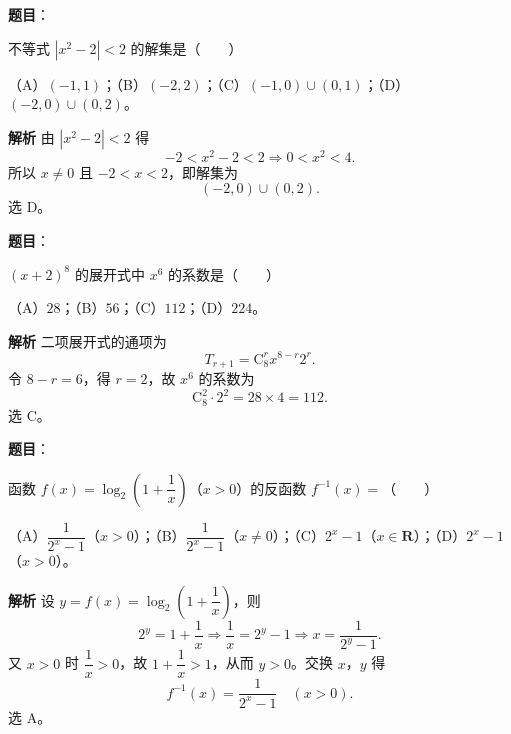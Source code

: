 \begin{answer}

\textbf{题目}：

不等式 $|x^2-2|<2$ 的解集是\mbox{（　　）}

（A）$(-1,1)$；（B）$(-2,2)$；（C）$(-1,0)\cup(0,1)$；（D）$(-2,0)\cup(0,2)$。

\textbf{解析}
由 $|x^2-2|<2$ 得
\nopagebreak[4]
\[-2<x^2-2<2\Longrightarrow 0<x^2<4.\]
所以 $x\neq0$ 且 $-2<x<2$，即解集为
\nopagebreak[4]
\[(-2,0)\cup(0,2).\]
选 D。


\end{answer}
\begin{answer}

\textbf{题目}：

$(x+2)^8$ 的展开式中 $x^6$ 的系数是\mbox{（　　）}

（A）$28$；（B）$56$；（C）$112$；（D）$224$。

\textbf{解析}
二项展开式的通项为
\nopagebreak[4]
\[T_{r+1}=\mathrm C_8^r x^{8-r}2^r.\]
令 $8-r=6$，得 $r=2$，故 $x^6$ 的系数为
\nopagebreak[4]
\[\mathrm C_8^2\cdot2^2=28\times4=112.\]
选 C。


\end{answer}
\begin{answer}

\textbf{题目}：

函数 $f(x)=\log_2\left(1+\dfrac1x\right)$（$x>0$）的反函数 $f^{-1}(x)=$\mbox{（　　）}

（A）$\dfrac1{2^x-1}$（$x>0$）；（B）$\dfrac1{2^x-1}$（$x\neq0$）；（C）$2^x-1$（$x\in\mathbf R$）；（D）$2^x-1$（$x>0$）。

\textbf{解析}
设 $y=f(x)=\log_2\left(1+\dfrac1x\right)$，则
\nopagebreak[4]
\[2^y=1+\frac1x\Longrightarrow \frac1x=2^y-1
\Longrightarrow x=\frac1{2^y-1}.\]
又 $x>0$ 时 $\dfrac1x>0$，故 $1+\dfrac1x>1$，从而 $y>0$。交换 $x$，$y$ 得
\nopagebreak[4]
\[f^{-1}(x)=\frac1{2^x-1}\quad(x>0).\]
选 A。


\end{answer}

